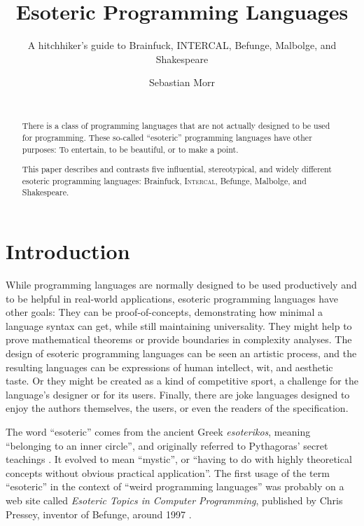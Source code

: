 \documentclass{sig-alternate}
\title{Esoteric Programming Languages}
\subtitle{A hitchhiker's guide to Brainfuck, INTERCAL, Befunge, Malbolge, and Shakespeare}
\author{\alignauthor Sebastian Morr\\\affaddr{Technical University Braunschweig}\\\email{sebastian@morr.cc}}
\newcommand{\ic}{\textsc{Intercal}}
\begin{document}
\maketitle

\begin{abstract}
    There is a class of programming languages that are not actually designed to be used for programming. These so-called “esoteric” programming languages have other purposes: To entertain, to be beautiful, or to make a point.

    This paper describes and contrasts five influential, stereotypical, and widely different esoteric programming languages: Brainfuck, \ic{}, Befunge, Malbolge, and Shakespeare.
\end{abstract}

\section{Introduction}
\label{introduction}

While programming languages are normally designed to be used productively and to be helpful in real-world applications, esoteric programming languages have other goals: They can be proof-of-concepts, demonstrating how minimal a language syntax can get, while still maintaining universality. They might help to prove mathematical theorems or provide boundaries in complexity analyses. The design of esoteric programming languages can be seen an artistic process, and the resulting languages can be expressions of human intellect, wit, and aesthetic taste. Or they might be created as a kind of competitive sport, a challenge for the language's designer or for its users. Finally, there are joke languages designed to enjoy the authors themselves, the users, or even the readers of the specification.

The word “esoteric” comes from the ancient Greek \emph{esoterikos}, meaning “belonging to an inner circle”, and originally referred to Pythagoras' secret teachings \cite{harper2014esoteric}. It evolved to mean “mystic”, or “having to do with highly theoretical concepts without obvious practical application”. The first usage of the term “esoteric” in the context of “weird programming languages” was probably on a web site called \emph{Esoteric Topics in Computer Programming}, published by Chris Pressey, inventor of Befunge, around 1997 \cite{pressey2005chris}.
\end{document}
